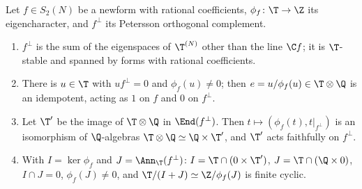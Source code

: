 \begin{theorem}\label{thm:hecke:newform-splitting}
Let $f\in S_2(N)$ be a newform with rational coefficients, $\phi_f\colon\T\to\Z$ its eigencharacter, and $f^\perp$ its Petersson orthogonal complement.
\begin{enumerate}[label=(\roman*)]
\item $f^\perp$ is the sum of the eigenspaces of $\T^{(N)}$ other than the line $\C f$; it is $\T$-stable and spanned by forms with rational coefficients.
\item There is $u\in\T$ with $uf^\perp=0$ and $\phi_f(u)\ne0$; then $e=u/\phi_f(u)\in\T\otimes\Q$ is an idempotent, acting as $1$ on $f$ and $0$ on $f^\perp$.
\item Let $\T'$ be the image of $\T\otimes\Q$ in $\End(f^\perp)$. Then $t\mapsto(\phi_f(t),t|_{f^\perp})$ is an isomorphism of $\Q$-algebras $\T\otimes\Q\simeq\Q\times\T'$, and $\T'$ acts faithfully on $f^\perp$.
\item With $I=\ker\phi_f$ and $J=\Ann_\T(f^\perp)$: $I=\T\cap(0\times\T')$, $J=\T\cap(\Q\times0)$, $I\cap J=0$, $\phi_f(J)\ne0$, and $\T/(I+J)\simeq\Z/\phi_f(J)$ is finite cyclic.
\end{enumerate}
\end{theorem}

